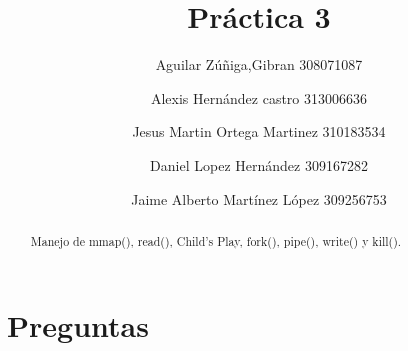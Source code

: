 \documentclass[a4paperx]{article}
\begin{document}
\title{Pr\'actica 3}
\author{
Aguilar Z\'u\~niga,Gibran 308071087 \and  Alexis Hernández castro 313006636 \and Jesus Martin Ortega Martinez 310183534 \and Daniel Lopez Hernández 309167282 \and Jaime Alberto Martínez López 309256753
}

\maketitle

\begin{abstract}
Manejo de mmap(), read(), Child's Play, fork(), pipe(), write() y kill().
\end{abstract}

\section{Preguntas}
\end{document}

